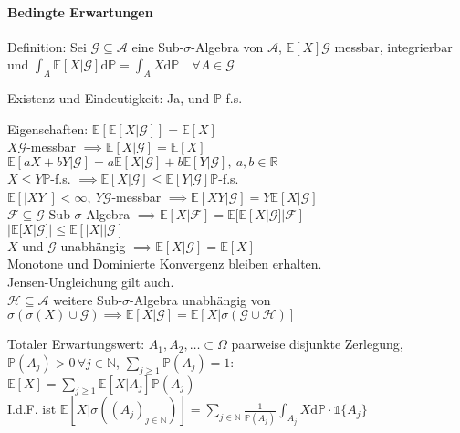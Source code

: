 \documentclass[a4paper,draft]{article}
\newcommand{\R}{\mathds{R}}
\newcommand{\N}{\mathds{N}}
\newcommand{\one}{\mathds{1}}
\newcommand{\A}{\mathcal{A}}
\renewcommand{\P}{\mathds{P}}
\newcommand{\E}[1]{\mathds{E}[#1]}
\newcommand{\G}{\mathcal{G}}
\newcommand{\F}{\mathcal{F}}
\newcommand{\cE}[2]{\E{#1 | #2}}
\renewcommand{\d}{\mathrm{d}}
\newcommand{\parh}{\par\hangindent=0.5cm}
\begin{document}
\begin{multicols}{2}
\paragraph{Bedingte Erwartungen}\hspace{0pt}\parh
Definition: Sei $\mathcal{G} \subseteq \A$ eine Sub-$\sigma$-Algebra von $\A$, $\E{X}{\G}$ messbar, integrierbar und $\int_A \cE{X}{\G}\d \P = \int_A X \d \P \quad \forall A \in \G$\parh
Existenz und Eindeutigkeit: Ja, und $\P$-f.s.\parh
Eigenschaften: $\E{\cE{X}{\G}}=\E{X}$\\
$X \G$-messbar $\implies \cE{X}{\G}=\E{X}$\\
$\cE{aX+bY}{\G}=a\cE{X}{\G}+b\cE{Y}{\G},\:a,b\in\R$\\
$X\leq Y \P$-f.s. $\implies \cE{X}{\G}\leq\cE{Y}{\G} \P$-f.s.\\
$\E{|XY|}<\infty,\:Y \G$-messbar $\implies \cE{XY}{\G}=Y\cE{X}{\G}$\\
$\F\subseteq\G$ Sub-$\sigma$-Algebra $\implies \cE{X}{\F}=\cE{\cE{X}{\G}}{\F}$\\
$|\cE{X}{\G}|\leq\cE{|X|}{\G}$\\
$X$ und $\G$ unabhängig $\implies \cE{X}{\G}=\E{X}$\\
Monotone und Dominierte Konvergenz bleiben erhalten.\\
Jensen-Ungleichung gilt auch.\\
$\mathcal{H}\subseteq\A$ weitere Sub-$\sigma$-Algebra unabhängig von $\sigma(\sigma(X)\cup\G) \implies \cE{X}{\G}=\cE{X}{\sigma(\G\cup\mathcal{H})}$\parh
Totaler Erwartungswert: $A_1, A_2,\dots\subset\Omega$ paarweise disjunkte Zerlegung, $\P(A_j)>0\,\forall j\in\N$, $\sum_{j\geq 1}\P(A_j)=1$:\\
$\E{X}=\sum_{j\geq 1}\cE{X}{A_j}\P(A_j)$\\
I.d.F. ist $\cE{X}{\sigma((A_j)_{j\in\N})}=\sum_{j\in\N}\frac{1}{\P(A_j)}\int_{A_j}X\d\P\cdot\one\{A_j\}$


\end{multicols}
\end{document}
